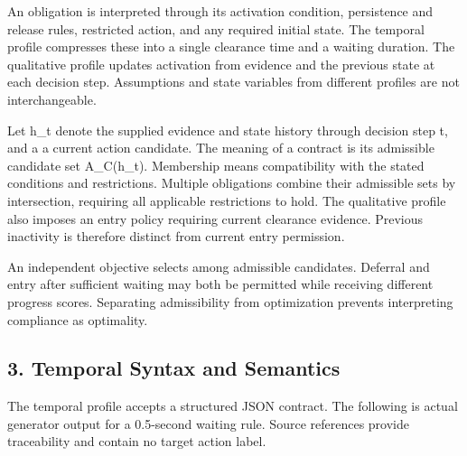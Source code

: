 \documentclass[11pt,a4paper]{article}
\begin{document}
An obligation is interpreted through its activation condition, persistence and release rules, restricted action, and any required initial state. The temporal profile compresses these into a single clearance time and a waiting duration. The qualitative profile updates activation from evidence and the previous state at each decision step. Assumptions and state variables from different profiles are not interchangeable.\par

Let h\_t denote the supplied evidence and state history through decision step t, and a a current action candidate. The meaning of a contract is its admissible candidate set {\ttfamily\small A\_C(h\_t)}. Membership means compatibility with the stated conditions and restrictions. Multiple obligations combine their admissible sets by intersection, requiring all applicable restrictions to hold. The qualitative profile also imposes an entry policy requiring current clearance evidence. Previous inactivity is therefore distinct from current entry permission.\par

An independent objective selects among admissible candidates. Deferral and entry after sufficient waiting may both be permitted while receiving different progress scores. Separating admissibility from optimization prevents interpreting compliance as optimality.\par

\subsection*{3. Temporal Syntax and Semantics}

The temporal profile accepts a structured JSON contract. The following is actual generator output for a 0.5-second waiting rule. Source references provide traceability and contain no target action label.\par
\end{document}
